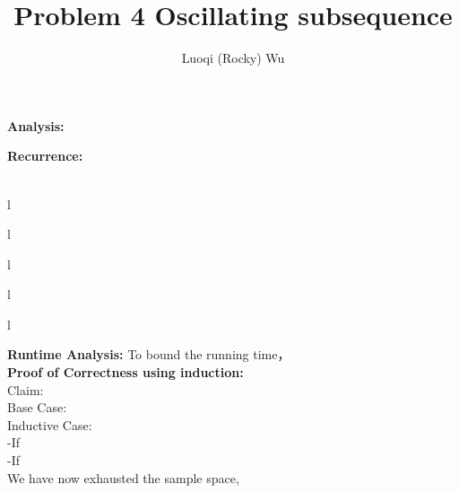 \documentclass[12pt]{article}
\title{Problem 4 Oscillating subsequence}
\author{Luoqi (Rocky) Wu}
\begin{document}
\maketitle

\textbf{Analysis:}

\textbf{Recurrence:}


\pagebreak

\begin{algorithm}
\caption{}
\KwIn{}
\KwOut{}
\hrulefill\\


l \tcp*[r]{}

l 


l  {
	
l 
        }

l \Return{}
\end{algorithm}

\pagebreak

\textbf{Runtime Analysis:} To bound the running time， \\

\textbf{Proof of Correctness using induction:} \\

Claim: \\

Base Case: \\

Inductive Case: \\

-If \\

-If \\

We have now exhausted the sample space, \\
\end{document}
